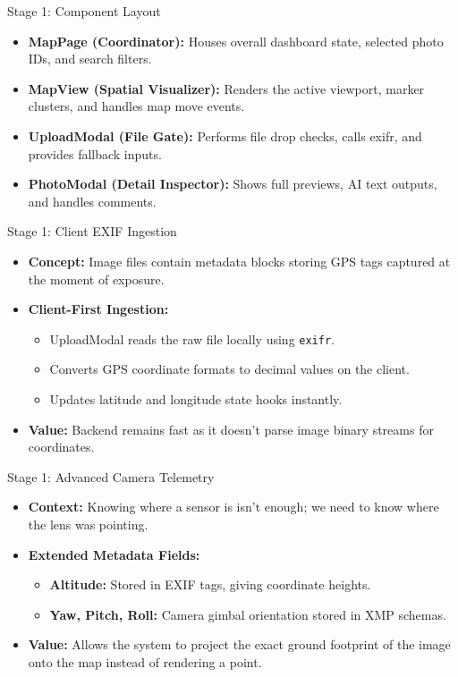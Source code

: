 \documentclass[aspectratio=169]{beamer}
\begin{document}
\begin{frame}{Stage 1: Component Layout}
  \begin{itemize}
    \item \textbf{MapPage (Coordinator):} Houses overall dashboard state, selected photo IDs, and search filters.
    \item \textbf{MapView (Spatial Visualizer):} Renders the active viewport, marker clusters, and handles map move events.
    \item \textbf{UploadModal (File Gate):} Performs file drop checks, calls exifr, and provides fallback inputs.
    \item \textbf{PhotoModal (Detail Inspector):} Shows full previews, AI text outputs, and handles comments.
  \end{itemize}
\end{frame}

\begin{frame}{Stage 1: Client EXIF Ingestion}
  \begin{itemize}
    \item \textbf{Concept:} Image files contain metadata blocks storing GPS tags captured at the moment of exposure.
    \item \textbf{Client-First Ingestion:}
      \begin{itemize}
        \item UploadModal reads the raw file locally using \texttt{exifr}.
        \item Converts GPS coordinate formats to decimal values on the client.
        \item Updates latitude and longitude state hooks instantly.
      \end{itemize}
    \item \textbf{Value:} Backend remains fast as it doesn't parse image binary streams for coordinates.
  \end{itemize}
\end{frame}

\begin{frame}{Stage 1: Advanced Camera Telemetry}
  \begin{itemize}
    \item \textbf{Context:} Knowing where a sensor is isn't enough; we need to know where the lens was pointing.
    \item \textbf{Extended Metadata Fields:}
      \begin{itemize}
        \item \textbf{Altitude:} Stored in EXIF tags, giving coordinate heights.
        \item \textbf{Yaw, Pitch, Roll:} Camera gimbal orientation stored in XMP schemas.
      \end{itemize}
    \item \textbf{Value:} Allows the system to project the exact ground footprint of the image onto the map instead of rendering a point.
  \end{itemize}
\end{frame}
\end{document}
